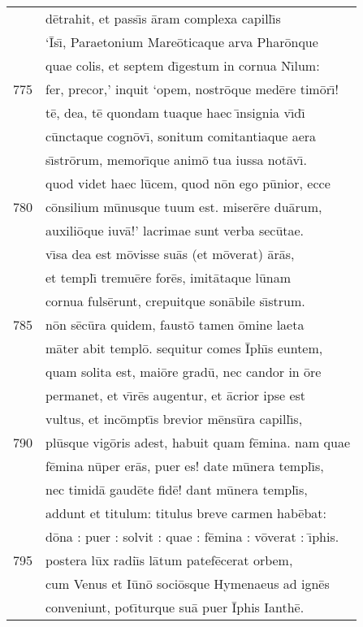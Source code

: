 \documentclass[paper=6in:9in,pagesize=pdftex,
               headinclude=on,footinclude=on,12pt]{scrbook}
\begin{document}
\begin{longtable}[p]{ r l }
 & d\=etrahit, et pass\={\i}s \=aram complexa capill\={\i}s\\ 
 & `\=Is\={\i}, Paraetonium Mare\=oticaque arva Phar\=onque\\ 
 & quae colis, et septem d\={\i}gestum in cornua N\={\i}lum:\\ 
775 & fer, precor,' inquit `opem, nostr\=oque med\=ere tim\=or\={\i}!\\ 
 & t\=e, dea, t\=e quondam tuaque haec \={\i}nsignia v\={\i}d\={\i}\\ 
 & c\=unctaque cogn\=ov\={\i}, sonitum comitantiaque aera\\ 
 & s\={\i}str\=orum, memor\={\i}que anim\=o tua iussa not\=av\={\i}.\\ 
 & quod videt haec l\=ucem, quod n\=on ego p\=unior, ecce\\ 
780 & c\=onsilium m\=unusque tuum est. miser\=ere du\=arum,\\ 
 & auxili\=oque iuv\=a!' lacrimae sunt verba sec\=utae.\\ 
 & v\={\i}sa dea est m\=ovisse su\=as (et m\=overat) \=ar\=as,\\ 
 & et templ\={\i} tremu\=ere for\=es, imit\=ataque l\=unam\\ 
 & cornua fuls\=erunt, crepuitque son\=abile s\={\i}strum.\\ 
785 & n\=on s\=ec\=ura quidem, faust\=o tamen \=omine laeta\\ 
 & m\=ater abit templ\=o. sequitur comes \=Iph\={\i}s euntem,\\ 
 & quam solita est, mai\=ore grad\=u, nec candor in \=ore\\ 
 & permanet, et v\={\i}r\=es augentur, et \=acrior ipse est\\ 
 & vultus, et inc\=ompt\={\i}s brevior m\=ens\=ura capill\={\i}s,\\ 
790 & pl\=usque vig\=oris adest, habuit quam f\=emina. nam quae\\ 
 & f\=emina n\=uper er\=as, puer es! date m\=unera templ\={\i}s,\\ 
 & nec timid\=a gaud\=ete fid\=e! dant m\=unera templ\={\i}s,\\ 
 & addunt et titulum: titulus breve carmen hab\=ebat:\\ 
 & d\=ona : puer : solvit : quae : f\=emina : v\=overat : \={\i}phis.\\ 
795 & postera l\=ux radi\={\i}s l\=atum patef\=ecerat orbem,\\ 
 & cum Venus et I\=un\=o soci\=osque Hymenaeus ad ign\=es\\ 
 & conveniunt, pot\={\i}turque su\=a puer \=Iphis Ianth\=e.\\ 

\end{longtable}
\end{document}
